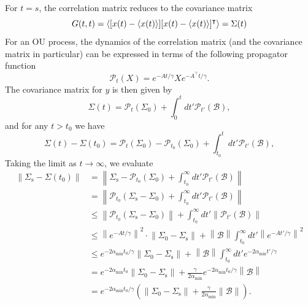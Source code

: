 \documentclass[prx,onecolumn,floatfix,longbibliography,notitlepage, nofootinbib]{revtex4-1}
\renewcommand{\leq}{\leqslant}
\begin{document}
\begin{appendix}
For $t=s$, the correlation matrix reduces to the covariance matrix
\begin{equation}
    G(t,t) = \braket{[x(t) - \braket{x(t)}][x(t) - \braket{x(t)}]^\intercal} = \Sigma(t)
\end{equation}
For an OU process, the dynamics of the correlation matrix (and the covariance matrix in particular) can be expressed in terms of the following propagator function
\begin{equation}
    \mathcal{P}_t(X) = e^{-A t/\gamma} X e^{-A^\intercal t/\gamma}.
\end{equation}
The covariance matrix for $y$ is then given by
\begin{equation}
\label{sigma-time-dep-app}
    \Sigma(t) = \mathcal{P}_t(\Sigma_0) + \int_0^t dt' \mathcal{P}_{t'} (\mathcal{B}),
\end{equation}
and for any $t > t_0$ we have
\begin{equation}
\label{sigma-error-time-dep-app}
    \Sigma(t) - \Sigma(t_0)=\mathcal{P}_{t}(\Sigma_0) -\mathcal{P}_{t_0}(\Sigma_0) + \int_{t_0}^{t} dt' \mathcal{P}_{t'} (\mathcal{B}),
\end{equation}
Taking the limit as $t \to \infty$, we evaluate
\begin{align}
    \left\|\Sigma_\text{s} - \Sigma(t_0) \right\| &= \left\| \Sigma_\text{s} -\mathcal{P}_{t_0}(\Sigma_0) + \int_{t_0}^{\infty} dt' \mathcal{P}_{t'} (\mathcal{B})\right\| \\
    & =  \left\|\mathcal{P}_{t_0}( \Sigma_\text{s} - \Sigma_0) + \int_{t_0}^{\infty} dt' \mathcal{P}_{t'} (\mathcal{B})\right\| \\
    & \leq
 \left\| \mathcal{P}_{t_0} (\Sigma_\text{s} - \Sigma_0) \right\|+ \int_{t_0}^\infty dt' \left\| \mathcal{P}_{t'}(\mathcal{B})\right\|\\
 & \leq 
  \left\| e^{-A t/\gamma}\right\|^2 \cdot \left\| \Sigma_0 - \Sigma_\text{s}\right\|+ \left\|\mathcal{B}\right\|\int_{t_0}^\infty dt' \left\| e^{-A t'/\gamma}\right\|^2 \\
  & \leq     e^{- 2\alpha_\text{min} t_0/\gamma }\left\| \Sigma_0 - \Sigma_\text{s}\right\|+ \left\|\mathcal{B}\right\|\int_{t_0}^\infty dt' e^{-2 \alpha_\text{min} t'/\gamma} \\
  & =  e^{- 2\alpha_\text{min} t_0 }\left\| \Sigma_0 - \Sigma_\text{s}\right\|+\frac{\gamma}{2\alpha_\text{min}}e^{-2 \alpha_\text{min}t_0/\gamma} \left\|\mathcal{B}\right\| \\
  & =  e^{- 2\alpha_\text{min} t_0/\gamma }\left(\left\| \Sigma_0 - \Sigma_\text{s}\right\|+\frac{\gamma}{2  \alpha_\text{min}}\|\mathcal{B}\|\right).

\end{align}
\end{appendix}
\end{document}
